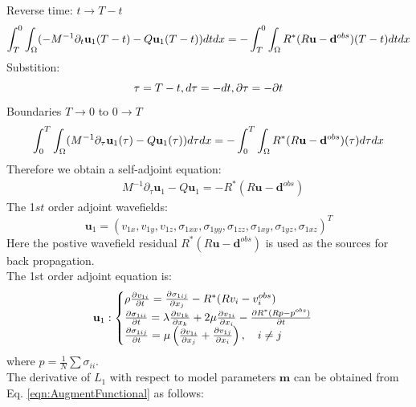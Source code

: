 \documentclass[pdftex,a4paper,parskip,listof=totoc,bibliography=totoc,onehalfspacing,12pt]{scrreprt}
\begin{document}
Reverse time: $t \to T-t$
\begin{equation}
 \int_T^0 \int_\Omega (-M^{-1} \partial_{t} \mathbf{u}_{1}(T-t) - Q \mathbf{u}_{1}(T-t) )  dt dx = -\int_T^0 \int_\Omega R^{*}(R\mathbf{u} - \mathbf{d}^{obs})(T-t) dt dx\\
\end{equation}
Substition: 
\begin{equation}
 \tau = T - t, d\tau = -dt, \partial \tau = -\partial t\\
\end{equation}
Boundaries $T \to 0$ to $0 \to T$
\begin{equation}
 \int_0^T \int_\Omega (M^{-1} \partial_{\tau} \mathbf{u}_{1}(\tau) - Q \mathbf{u}_{1}(\tau) )  d\tau dx = -\int_0^T \int_\Omega R^{*}(R\mathbf{u} - \mathbf{d}^{obs})(\tau) d\tau dx\\
\end{equation}
Therefore we obtain a self-adjoint equation:
\begin{equation}
\begin{align*}
\label{eqn:AdjointEquation1}
& M^{-1} \partial_{\tau} \mathbf{u}_{1} - Q \mathbf{u}_{1} =  - R^{*}(R\mathbf{u} - \mathbf{d}^{obs})
\end{align*}
\end{equation}
The 1$st$ order adjoint wavefields:
\begin{equation}
\mathbf{ u}_1=\left(v_{1x},v_{1y},v_{1z},\sigma_{1xx},\sigma_{1yy},\sigma_{1zz},\sigma_{1xy},\sigma_{1yz},\sigma_{1xz}\right)^T
\end{equation}
Here the postive wavefield residual $R^{*}(R\mathbf{u} - \mathbf{d}^{obs}) $ is used as the sources for back propagation. \\
The 1st order adjoint equation is:
\begin{equation}
\label{eqn:AdjointEquation11}
\mathbf{u}_{1}:
\begin{cases}
\rho\pdv{v_{1i}}{t}=\pdv{\sigma_{1ij}}{x_j}-R^{*}(R v_i -v_i^{obs})\\
\pdv{\sigma_{1ii}}{t} = \lambda \pdv{v_{1k}}{x_k} + 2\mu \pdv{v_{1i}}{x_i}-\pdv{R^{*}(R p - p^{obs})}{t}\\
\pdv{\sigma_{1ij}}{t} = \mu \left(\pdv{v_{1i}}{x_j} +\pdv{v_{1j}}{x_i}\right), \quad i \neq j
\end{cases}
\end{equation}
where $p=\frac{1}{N} \sum \sigma_{ii}$.\\
The derivative of $L_1$ with respect to model parameters $\mathbf{m}$ can be obtained from Eq. \ref{eqn:AugmentFunctional} as follows:
\end{document}
